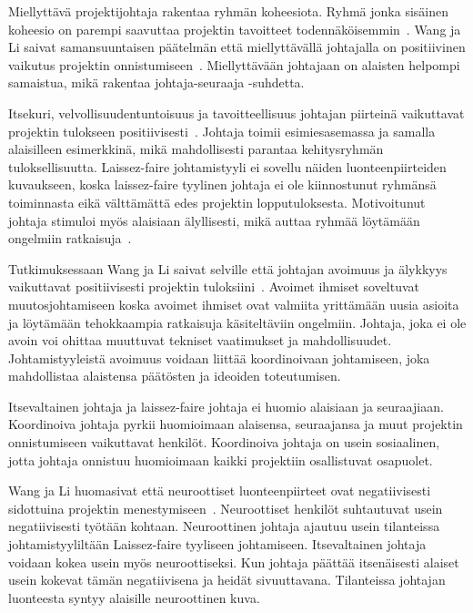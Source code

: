 \documentclass[finnish]{tktltiki2}
\theoremstyle{definition}
\theoremstyle{remark}
\begin{document}
Miellyttävä projektijohtaja rakentaa ryhmän koheesiota. Ryhmä jonka sisäinen koheesio on parempi saavuttaa projektin tavoitteet todennäköisemmin~\cite{bahli2005group}. Wang ja Li saivat samansuuntaisen päätelmän että miellyttävällä johtajalla on positiivinen vaikutus projektin onnistumiseen~\cite{Wang:2009:PMP:1639950.1640049}. Miellyttävään johtajaan on alaisten helpompi samaistua, mikä rakentaa johtaja-seuraaja -suhdetta.

Itsekuri, velvollisuudentuntoisuus ja tavoitteellisuus johtajan piirteinä vaikuttavat projektin tulokseen positiivisesti~\cite{Wang:2009:PMP:1639950.1640049}. Johtaja toimii esimiesasemassa ja samalla alaisilleen esimerkkinä, mikä mahdollisesti parantaa kehitysryhmän tuloksellisuutta. Laissez-faire johtamistyyli ei sovellu näiden luonteenpiirteiden kuvaukseen, koska laissez-faire tyylinen johtaja ei ole kiinnostunut ryhmänsä toiminnasta eikä välttämättä edes projektin lopputuloksesta. Motivoitunut johtaja stimuloi myös alaisiaan älyllisesti, mikä auttaa ryhmää löytämään ongelmiin ratkaisuja~\cite{thite2000leadership}.

Tutkimuksessaan Wang ja Li saivat selville että johtajan avoimuus ja älykkyys vaikuttavat positiivisesti projektin tuloksiini~\cite{Wang:2009:PMP:1639950.1640049}. Avoimet ihmiset soveltuvat muutosjohtamiseen koska avoimet ihmiset ovat valmiita yrittämään uusia asioita ja löytämään tehokkaampia ratkaisuja käsiteltäviin ongelmiin. Johtaja, joka ei ole avoin voi ohittaa muuttuvat tekniset vaatimukset ja mahdollisuudet. Johtamistyyleistä avoimuus voidaan liittää koordinoivaan johtamiseen, joka mahdollistaa alaistensa päätösten ja ideoiden toteutumisen.

Itsevaltainen johtaja ja laissez-faire johtaja ei huomio alaisiaan ja seuraajiaan. Koordinoiva johtaja pyrkii huomioimaan alaisensa, seuraajansa ja muut projektin onnistumiseen vaikuttavat henkilöt. Koordinoiva johtaja on usein sosiaalinen, jotta johtaja onnistuu huomioimaan kaikki projektiin osallistuvat osapuolet.

Wang ja Li huomasivat että neuroottiset luonteenpiirteet ovat negatiivisesti sidottuina projektin menestymiseen~\cite{Wang:2009:PMP:1639950.1640049}. Neuroottiset henkilöt suhtautuvat usein negatiivisesti työtään kohtaan. Neuroottinen johtaja ajautuu usein tilanteissa johtamistyyliltään Laissez-faire tyyliseen johtamiseen. Itsevaltainen johtaja voidaan kokea usein myös neuroottiseksi. Kun johtaja päättää itsenäisesti alaiset usein kokevat tämän negatiivisena ja heidät sivuuttavana. Tilanteissa johtajan luonteesta syntyy alaisille neuroottinen kuva.
\end{document}
